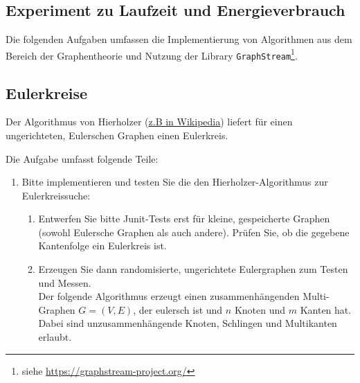 \documentclass{article}
\begin{document}

 
\newpage
\begin{appendix}

\section{Experiment zu Laufzeit und Energieverbrauch}
\label{a.ex}

Die folgenden Aufgaben umfassen die Implementierung von  Algorithmen aus dem Bereich der Graphentheorie und  Nutzung der Library \texttt{GraphStream}\footnote{%
   siehe  \href{https://graphstream-project.org/}{https://graphstream-project.org/}}.
	
\subsection*{Eulerkreise}
   Der Algorithmus von Hierholzer (\href{https://de.wikipedia.org/wiki/Algorithmus_von_Hierholzer}{z.B in Wikipedia})  liefert für  einen ungerichteten, Eulerschen Graphen einen Eulerkreis. 

		
Die Aufgabe umfasst folgende Teile:
			\begin{enumerate}
				\item Bitte implementieren und testen  Sie die den Hierholzer-Algorithmus zur Eulerkreissuche: 
				   \begin{enumerate}
								\item Entwerfen Sie bitte Junit-Tests erst für kleine, gespeicherte Graphen
								   (sowohl Eulersche Graphen als auch andere). 
									 Prüfen  Sie, ob die gegebene Kantenfolge ein Eulerkreis ist.							
								\item Erzeugen Sie dann randomisierte, ungerichtete  Eulergraphen zum Testen und Messen.\\
												
			Der folgende Algorithmus erzeugt einen zusammenhängenden Multi-Graphen $G=(V,E)$, der eulersch ist und $n$ Knoten und $m$ Kanten hat. Dabei sind unzusammenhängende Knoten, Schlingen und Multikanten erlaubt.

\end{enumerate}
\end{enumerate}
\end{appendix}
\end{document}
